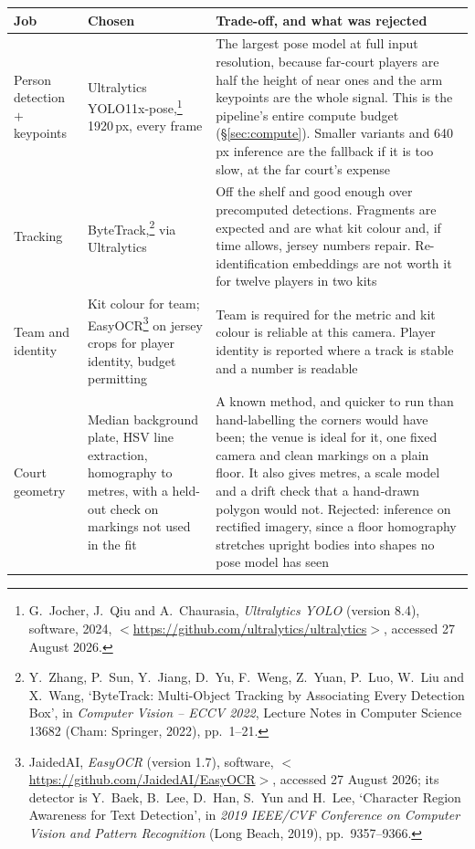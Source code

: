 \documentclass[10pt,a4paper]{article}
\begin{document}
{\footnotesize
\begin{xltabular}{\textwidth}{L{29mm} L{30mm} X}
\toprule
\textbf{Job} & \textbf{Chosen} & \textbf{Trade-off, and what was rejected}\\
\midrule
Person detection $+$ keypoints & Ultralytics YOLO11x-pose,\footnote{G.\ Jocher, J.\ Qiu
and A.\ Chaurasia, \emph{Ultralytics YOLO} (version 8.4), software, 2024,
$<$\url{https://github.com/ultralytics/ultralytics}$>$, accessed 27 August 2026.}
1920\,px, every frame & The largest pose model at full input resolution, because far-court players are half the height of near ones and the arm keypoints are the whole signal. This is the pipeline's entire compute budget (\S\ref{sec:compute}). Smaller variants and 640\,px inference are the fallback if it is too slow, at the far court's expense\\
Tracking & ByteTrack,\footnote{Y.\ Zhang, P.\ Sun, Y.\ Jiang, D.\ Yu, F.\ Weng,
Z.\ Yuan, P.\ Luo, W.\ Liu and X.\ Wang, `ByteTrack: Multi-Object Tracking by
Associating Every Detection Box', in \emph{Computer Vision -- ECCV 2022}, Lecture Notes in
Computer Science 13682 (Cham: Springer, 2022), pp.\ 1--21.} via Ultralytics & Off the shelf and good enough over precomputed detections. Fragments are expected and are what kit colour and, if time allows, jersey numbers repair. Re-identification embeddings are not worth it for twelve players in two kits\\
Team and identity & Kit colour for team; EasyOCR\footnote{JaidedAI, \emph{EasyOCR}
(version 1.7), software, $<$\url{https://github.com/JaidedAI/EasyOCR}$>$, accessed
27 August 2026; its detector is Y.\ Baek, B.\ Lee, D.\ Han, S.\ Yun and H.\ Lee,
`Character Region Awareness for Text Detection', in \emph{2019 IEEE/CVF Conference on
Computer Vision and Pattern Recognition} (Long Beach, 2019), pp.\ 9357--9366.} on jersey
crops for player identity, budget permitting & Team is required for the metric and kit colour is reliable at this camera. Player identity is reported where a track is stable and a number is readable\\
Court geometry & Median background plate, HSV line extraction, homography to metres, with a held-out check on markings not used in the fit & A known method, and quicker to run than hand-labelling the corners would have been; the venue is ideal for it, one fixed camera and clean markings on a plain floor. It also gives metres, a scale model and a drift check that a hand-drawn polygon would not. Rejected: inference on rectified imagery, since a floor homography stretches upright bodies into shapes no pose model has seen\\

\end{xltabular}}
\end{document}
